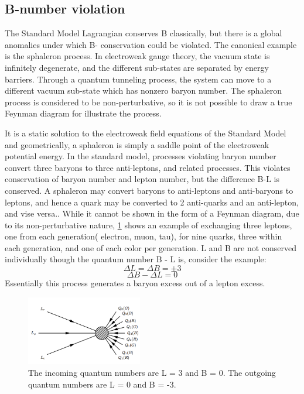 \subsection{B-number violation}
The Standard Model Lagrangian conserves B classically, but there is a global anomalies under which B- conservation could be violated. The canonical example is the sphaleron process. In electroweak gauge theory, the vacuum state is infinitely degenerate, and the different sub-states are separated by energy barriers. Through a quantum tunneling process, the system can move to a different vacuum sub-state which has nonzero baryon number.\cite{13}\cite{5} The sphaleron process is considered to be non-perturbative, so it is not possible to draw a true Feynman diagram for illustrate the process.
\par It is a static solution to the electroweak field equations of the Standard Model and geometrically, a sphaleron is simply a saddle point of the electroweak potential energy\cite{8}\cite{13}. In the standard model, processes violating baryon number convert three baryons to three anti-leptons, and related processes. This violates conservation of baryon number and lepton number, but the difference B-L is conserved. A sphaleron may convert baryons to anti-leptons and anti-baryons to leptons, and hence a quark may be converted to 2 anti-quarks and an anti-lepton, and vise versa.\cite{5}. While it cannot be shown in the form of a Feynman diagram, due to its non-perturbative nature, \cref{BL} shows an example of exchanging three leptons, one from each generation( electron, muon, tau), for nine quarks, three within each generation, and one of each color per generation. L and B are not conserved individually though the quantum number B - L is, consider the example\cite{13}:
\begin{equation}
\Delta L = \Delta B = \pm3 
\end{equation}
\begin{equation}
\Delta B - \Delta L = 0
\end{equation}
Essentially this process generates a baryon excess out of a lepton excess. \cite{5}
\begin{figure}[hbt!] \label{BL}
\begin{center}
\includegraphics[width=0.451\textwidth]{figs/bl.png}
\caption{The incoming quantum numbers are L = 3 and B = 0. The outgoing quantum numbers are L = 0 and B = -3.}
\end{center}
\end{figure}
